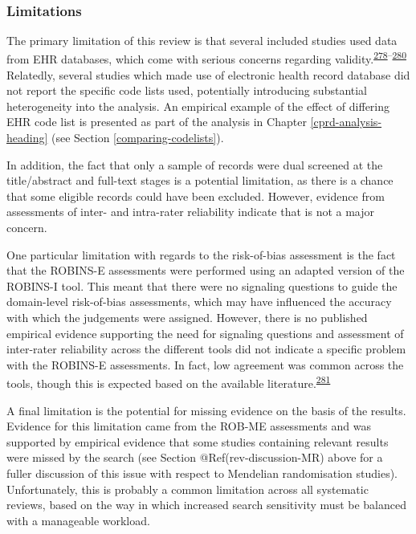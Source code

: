 \documentclass[a4paper, twoside]{templates/ociamthesis}
\begin{document}
~

\hypertarget{limitations}{%
\subsubsection{Limitations}\label{limitations}}

The primary limitation of this review is that several included studies used data from EHR databases, which come with serious concerns regarding validity.\textsuperscript{\protect\hyperlink{ref-hsieh2019}{278}--\protect\hyperlink{ref-wilkinson2018}{280}} Relatedly, several studies which made use of electronic health record database did not report the specific code lists used, potentially introducing substantial heterogeneity into the analysis. An empirical example of the effect of differing EHR code list is presented as part of the analysis in Chapter \ref{cprd-analysis-heading} (see Section \ref{comparing-codelists}).

In addition, the fact that only a sample of records were dual screened at the title/abstract and full-text stages is a potential limitation, as there is a chance that some eligible records could have been excluded. However, evidence from assessments of inter- and intra-rater reliability indicate that is not a major concern.

One particular limitation with regards to the risk-of-bias assessment is the fact that the ROBINS-E assessments were performed using an adapted version of the ROBINS-I tool. This meant that there were no signaling questions to guide the domain-level risk-of-bias assessments, which may have influenced the accuracy with which the judgements were assigned. However, there is no published empirical evidence supporting the need for signaling questions and assessment of inter-rater reliability across the different tools did not indicate a specific problem with the ROBINS-E assessments. In fact, low agreement was common across the tools, though this is expected based on the available literature.\textsuperscript{\protect\hyperlink{ref-jeyaraman2020}{281}}

A final limitation is the potential for missing evidence on the basis of the results. Evidence for this limitation came from the ROB-ME assessments and was supported by empirical evidence that some studies containing relevant results were missed by the search (see Section @Ref(rev-discussion-MR) above for a fuller discussion of this issue with respect to Mendelian randomisation studies). Unfortunately, this is probably a common limitation across all systematic reviews, based on the way in which increased search sensitivity must be balanced with a manageable workload.
\end{document}
